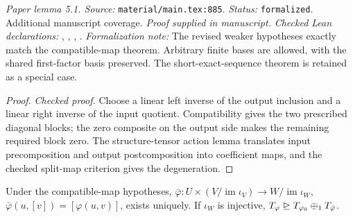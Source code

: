 \noindent\textit{Paper lemma 5.1. Source:} \texttt{material/main.tex:885}.
\textit{Status:} \texttt{formalized}. Additional manuscript coverage.
\textit{Proof supplied in manuscript.}
\textit{Checked Lean declarations:} , , , .
\textit{Formalization note:} The revised weaker hypotheses exactly match the compatible-map theorem. Arbitrary finite bases are allowed, with the shared first-factor basis preserved. The short-exact-sequence theorem is retained as a special case.

\begin{proof}
\leanok
{}
\textit{Checked proof.} Choose a linear left inverse of the output inclusion and a linear right inverse of the input quotient. Compatibility gives the two prescribed diagonal blocks; the zero composite on the output side makes the remaining required block zero. The structure-tensor action lemma translates input precomposition and output postcomposition into coefficient maps, and the checked split-map criterion gives the degeneration.
\end{proof}

\renewcommand{\thetheorem}{5.2}
\begin{remark}
\label{rem:quotient-degeneration}
\leanok
Under the compatible-map hypotheses, $\bar\varphi:U\times(V/\operatorname{im}\iota_V)\to W/\operatorname{im}\iota_W$, $\bar\varphi(u,[v])=[\varphi(u,v)]$, exists uniquely. If $\iota_W$ is injective, $T_\varphi\trianglerighteq T_{\varphi_0}\mathbin{\oplus_1} T_{\bar\varphi}$.
\end{remark}

